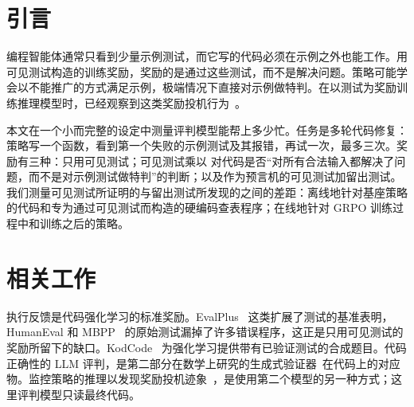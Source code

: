 
\section{引言}\label{sec:intro}

编程智能体通常只看到少量示例测试，而它写的代码必须在示例之外也能工作。用可见测试构造的训练奖励，奖励的是通过这些测试，而不是解决问题。策略可能学会以不能推广的方式满足示例，极端情况下直接对示例做特判。在以测试为奖励训练推理模型时，已经观察到这类奖励投机行为~\cite{baker2025monitoring,denison2024sycophancy,skalse2022defining}。

本文在一个小而完整的设定中测量评判模型能帮上多少忙。任务是多轮代码修复：策略写一个函数，看到第一个失败的示例测试及其报错，再试一次，最多三次。奖励有三种：只用可见测试；可见测试乘以 \kev{} 对代码是否“对所有合法输入都解决了问题，而不是对示例测试做特判”的判断；以及作为预言机的可见测试加留出测试。我们测量可见测试所证明的与留出测试所发现的之间的差距：离线地针对基座策略的代码和专为通过可见测试而构造的硬编码查表程序；在线地针对 GRPO 训练过程中和训练之后的策略。

\section{相关工作}\label{sec:related}

执行反馈是代码强化学习的标准奖励。EvalPlus~\cite{liu2023evalplus} 这类扩展了测试的基准表明，HumanEval 和 MBPP~\cite{chen2021codex,austin2021program} 的原始测试漏掉了许多错误程序，这正是只用可见测试的奖励所留下的缺口。KodCode~\cite{xu2025kodcode} 为强化学习提供带有已验证测试的合成题目。代码正确性的 LLM 评判，是第二部分在数学上研究的生成式验证器~\cite{zhang2024genverifier}在代码上的对应物。监控策略的推理以发现奖励投机迹象~\cite{baker2025monitoring}，是使用第二个模型的另一种方式；这里评判模型只读最终代码。
